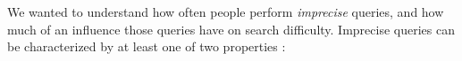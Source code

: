 


We wanted to understand how often people perform \textit{imprecise} queries, and how much of an influence those queries have on search difficulty. Imprecise queries can be characterized by at least one of two properties \cite{Lee:2012}: 

